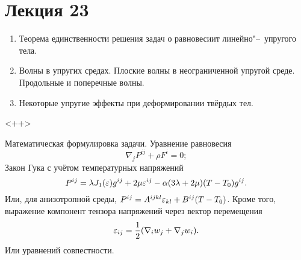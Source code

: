 \section{Лекция 23}
\begin{enumerate}
\item Теорема единственности решения задач о равновесиит линейно"--~упругого тела.
\item Волны в упругих средах. Плоские волны в неограниченной упругой среде. Продольные и поперечные волны.
\item Некоторые упругие эффекты при деформировании твёрдых тел.
\end{enumerate}<++>

Математическая формулировка задачи. Уравнение равновесия
\[
 \nabla_j P^{ij} + \rho F^i = 0;
\]
Закон Гука с учётом температурных напряжений
\[
  P^{ij} = \lambda J_1(\varepsilon)g^{ij} + 2\mu \varepsilon^{ij} - \alpha(3\lambda + 2\mu)(T-T_0) g^{ij}.
\]
Или, для анизотропной среды, $P^{ij} = A^{ijkl}\varepsilon_{kl}+ B^{ij}(T-T_0)$.
Кроме того, выражение компонент тензора напряжений через вектор перемещения
\[
  \varepsilon_{ij}=\frac12(\nabla_i w_j+\nabla_j w_i).
\]
Или уравнений совпестности.
